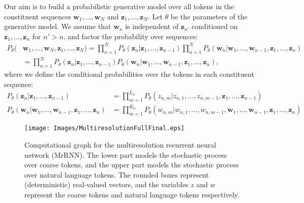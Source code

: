 \documentclass{article}
\begin{document}
Our aim is to build a probabilistic generative model over all tokens in the constituent sequences $\mathbf{w}_1, \dots, \mathbf{w}_N$ and $\mathbf{z}_1, \dots, \mathbf{z}_N$.
Let $\theta$ be the parameters of the generative model.
We assume that $\mathbf{w}_n$ is independent of $\mathbf{z}_{n'}$ conditioned on $\mathbf{z}_1, \dots, \mathbf{z}_{n}$ for $n' > n$, and factor the probability over sequences:
\begin{align}
P_{\theta}( & \mathbf{w}_1, \dots, \mathbf{w}_N, \mathbf{z}_1, \dots, \mathbf{z}_N) = \prod_{n=1}^N P_{\theta}(\mathbf{z}_n | \mathbf{z}_1, \dots, \mathbf{z}_{n-1}) \prod_{n=1}^N P_{\theta}(\mathbf{w}_n | \mathbf{w}_1, \dots, \mathbf{w}_{n-1}, \mathbf{z}_1, \dots, \mathbf{z}_{n}) \nonumber \\
& =  \prod_{n=1}^N P_{\theta}(\mathbf{z}_n | \mathbf{z}_1, \dots, \mathbf{z}_{n-1}) P_{\theta}(\mathbf{w}_n | \mathbf{w}_1, \dots, \mathbf{w}_{n-1}, \mathbf{z}_1, \dots, \mathbf{z}_{n}),
\end{align}
where we define the conditional probabilities over the tokens in each constituent sequence:
\begin{align}
P_{\theta}(\mathbf{z}_n | \mathbf{z}_1, \dots, \mathbf{z}_{n-1}) & = \prod_{m=1}^{L_n} P_{\theta}(z_{n,m} | z_{n,1}, \dots, z_{n,m-1}, \mathbf{z}_1, \dots, \mathbf{z}_{n-1})  \nonumber \\
P_{\theta}(\mathbf{w}_n | \mathbf{w}_1, \dots, \mathbf{w}_{n-1}, \mathbf{z}_1, \dots, \mathbf{z}_{n}) & = \prod_{m=1}^{K_n} P_{\theta}(w_{n,m} | w_{n,1}, \dots, w_{n,m-1}, \mathbf{w}_1, \dots, \mathbf{w}_{n-1}, \mathbf{z}_1, \dots, \mathbf{z}_{n}) \nonumber
\end{align}

\begin{figure}[ht]
  \centering
  \texttt{[image: Images/MultiresolutionFullFinal.eps]}
  \caption{Computational graph for the multiresolution recurrent neural network (MrRNN). The lower part models the stochastic process over coarse tokens, and the upper part models the stochastic process over natural language tokens. The rounded boxes represent (deterministic) real-valued vectors, and the variables $z$ and $w$ represent the coarse tokens and natural language tokens respectively.}
  \label{fig:MultiresolutionHRED}
\end{figure}
\end{document}
